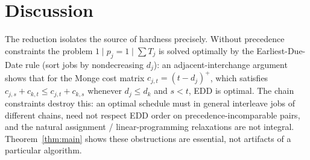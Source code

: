 \documentclass{amsart}
\theoremstyle{definition}
\theoremstyle{remark}
\begin{document}
\section{Discussion}

The reduction isolates the source of hardness precisely. Without precedence constraints
the problem $1\mid p_j=1\mid\sum T_j$ is solved optimally by the Earliest-Due-Date rule
(sort jobs by nondecreasing $d_j$): an adjacent-interchange argument shows that for the
Monge cost matrix $c_{j,t}=(t-d_j)^{+}$, which satisfies
$c_{j,s}+c_{k,t}\le c_{j,t}+c_{k,s}$ whenever $d_j\le d_k$ and $s<t$, EDD is optimal. The
chain constraints destroy this: an optimal schedule must in general interleave jobs of
different chains, need not respect EDD order on precedence-incomparable pairs, and the
natural assignment / linear-programming relaxations are not integral. Theorem~\ref{thm:main}
shows these obstructions are essential, not artifacts of a particular algorithm.
\end{document}
